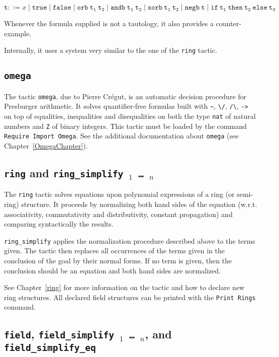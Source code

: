 \begin{coq_example*}
$$\mathtt{t} ::= x \mid \mathtt{true} \mid \mathtt{false}\mid \mathtt{orb\ t_1\ t_2}
\mid \mathtt{andb\ t_1\ t_2} \mid\mathtt{xorb\ t_1\ t_2} \mid\mathtt{negb\ t}
\mid\mathtt{if\ t_1\ then\ t_2\ else\ t_3}
$$

Whenever the formula supplied is not a tautology, it also provides a counter-example.

Internally, it uses a system very similar to the one of the {\tt ring} tactic.

\subsection{\tt omega}
\label{omega}

The tactic \texttt{omega}, due to Pierre Cr{\'e}gut,
is an automatic decision procedure for Presburger
arithmetic. It solves quantifier-free
formulas built with \verb|~|, \verb|\/|, \verb|/\|,
\verb|->| on top of equalities, inequalities and disequalities on
both the type \texttt{nat} of natural numbers and \texttt{Z} of binary
integers. This tactic must be loaded by the command \texttt{Require Import
  Omega}. See the additional documentation about \texttt{omega}
(see Chapter~\ref{OmegaChapter}).

\subsection{{\tt ring} and \tt ring\_simplify \term$_1$ \mbox{\dots} \term$_n$}

The {\tt ring} tactic solves equations upon polynomial expressions of
a ring (or semi-ring) structure. It proceeds by normalizing both hand
sides of the equation (w.r.t. associativity, commutativity and
distributivity, constant propagation) and comparing syntactically the
results.

{\tt ring\_simplify} applies the normalization procedure described
above to the terms given. The tactic then replaces all occurrences of
the terms given in the conclusion of the goal by their normal
forms. If no term is given, then the conclusion should be an equation
and both hand sides are normalized.

See Chapter~\ref{ring} for more information on the tactic and how to
declare new ring structures.  All declared field structures can be
printed with the {\tt Print Rings} command.

\subsection{{\tt field}, {\tt field\_simplify \term$_1$ \mbox{\dots}
  \term$_n$}, and \tt field\_simplify\_eq}


\end{coq_example*}
